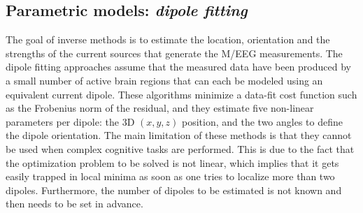 \subsection{Parametric models: \textit{dipole fitting}} \label{section_dipfit}
The goal of inverse methods is to estimate the location, orientation and the strengths of the current sources that generate the M/EEG measurements.
The dipole fitting approaches \cite{scherg1985two} assume that the measured data have been produced by a small number of active brain regions that can each be modeled using an equivalent current dipole. These algorithms minimize a data-fit cost function such as the Frobenius norm of the residual, and they estimate five non-linear parameters per dipole: the 3D $(x,y,z)$ position, and the two angles to define the dipole orientation. The main limitation of these methods is that they cannot be used when complex cognitive tasks are performed. This is due to the fact that the optimization problem to be solved is not linear, which implies that it gets easily trapped in local minima as soon as one tries to localize more than two dipoles. Furthermore, the number of dipoles to be estimated is not known and then needs to be set in advance. 

